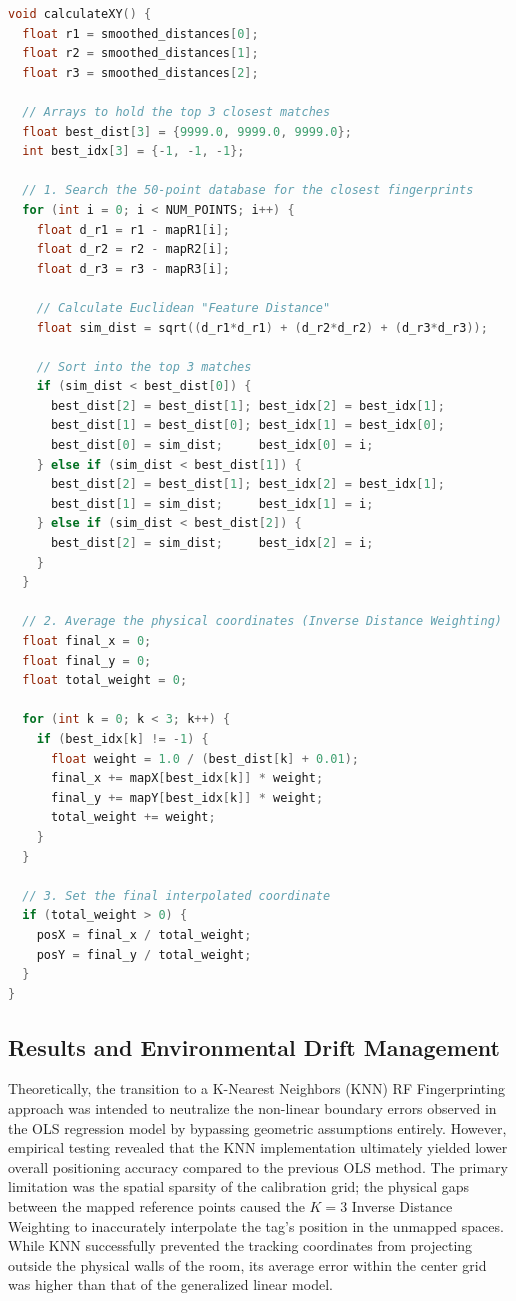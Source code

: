 \documentclass[conference]{IEEEtran}
\begin{document}
\begin{lstlisting}[language=C++]
void calculateXY() {
  float r1 = smoothed_distances[0];
  float r2 = smoothed_distances[1];
  float r3 = smoothed_distances[2];

  // Arrays to hold the top 3 closest matches
  float best_dist[3] = {9999.0, 9999.0, 9999.0};
  int best_idx[3] = {-1, -1, -1};

  // 1. Search the 50-point database for the closest fingerprints
  for (int i = 0; i < NUM_POINTS; i++) {
    float d_r1 = r1 - mapR1[i];
    float d_r2 = r2 - mapR2[i];
    float d_r3 = r3 - mapR3[i];

    // Calculate Euclidean "Feature Distance"
    float sim_dist = sqrt((d_r1*d_r1) + (d_r2*d_r2) + (d_r3*d_r3));

    // Sort into the top 3 matches
    if (sim_dist < best_dist[0]) {
      best_dist[2] = best_dist[1]; best_idx[2] = best_idx[1];
      best_dist[1] = best_dist[0]; best_idx[1] = best_idx[0];
      best_dist[0] = sim_dist;     best_idx[0] = i;
    } else if (sim_dist < best_dist[1]) {
      best_dist[2] = best_dist[1]; best_idx[2] = best_idx[1];
      best_dist[1] = sim_dist;     best_idx[1] = i;
    } else if (sim_dist < best_dist[2]) {
      best_dist[2] = sim_dist;     best_idx[2] = i;
    }
  }

  // 2. Average the physical coordinates (Inverse Distance Weighting)
  float final_x = 0; 
  float final_y = 0; 
  float total_weight = 0;
  
  for (int k = 0; k < 3; k++) {
    if (best_idx[k] != -1) {
      float weight = 1.0 / (best_dist[k] + 0.01); 
      final_x += mapX[best_idx[k]] * weight;
      final_y += mapY[best_idx[k]] * weight;
      total_weight += weight;
    }
  }

  // 3. Set the final interpolated coordinate
  if (total_weight > 0) {
    posX = final_x / total_weight;
    posY = final_y / total_weight;
  }
}
\end{lstlisting}

\subsection{Results and Environmental Drift Management}
Theoretically, the transition to a K-Nearest Neighbors (KNN) RF Fingerprinting approach was intended to neutralize the non-linear boundary errors observed in the OLS regression model by bypassing geometric assumptions entirely. However, empirical testing revealed that the KNN implementation ultimately yielded lower overall positioning accuracy compared to the previous OLS method. The primary limitation was the spatial sparsity of the calibration grid; the physical gaps between the mapped reference points caused the $K=3$ Inverse Distance Weighting to inaccurately interpolate the tag's position in the unmapped spaces. While KNN successfully prevented the tracking coordinates from projecting outside the physical walls of the room, its average error within the center grid was higher than that of the generalized linear model.
\end{document}
